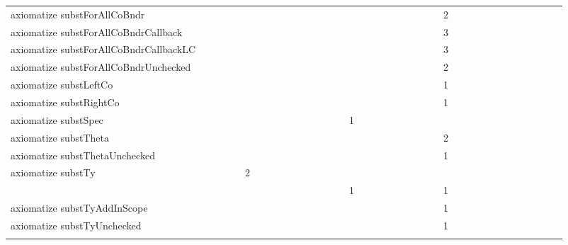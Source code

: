 {\begin{tabular}{l|rrr|rrr|rrr}
axiomatize substForAllCoBndr &  &  &  &  &  &  &  &  &  &  &  &  &  &  &  &  &  &  &  &  &  &  &  & 2 &  &  &  &  &  &  &  &  &  &  &  & \\
axiomatize substForAllCoBndrCallback &  &  &  &  &  &  &  &  &  &  &  &  &  &  &  &  &  &  &  &  &  &  &  & 3 &  &  &  &  &  &  &  &  &  &  &  & \\
axiomatize substForAllCoBndrCallbackLC &  &  &  &  &  &  &  &  &  &  &  &  &  &  &  &  &  &  &  &  &  &  &  & 3 &  &  &  &  &  &  &  &  &  &  &  & \\
axiomatize substForAllCoBndrUnchecked &  &  &  &  &  &  &  &  &  &  &  &  &  &  &  &  &  &  &  &  &  &  &  & 2 &  &  &  &  &  &  &  &  &  &  &  & \\
axiomatize substLeftCo &  &  &  &  &  &  &  &  &  &  &  &  &  &  &  &  &  &  &  &  &  &  &  & 1 &  &  &  &  &  &  &  &  &  &  &  & \\
axiomatize substRightCo &  &  &  &  &  &  &  &  &  &  &  &  &  &  &  &  &  &  &  &  &  &  &  & 1 &  &  &  &  &  &  &  &  &  &  &  & \\
axiomatize substSpec &  &  &  &  &  &  &  &  &  &  &  &  &  &  & 1 &  &  &  &  &  &  &  &  &  &  &  &  &  &  &  &  &  &  &  &  & \\
axiomatize substTheta &  &  &  &  &  &  &  &  &  &  &  &  &  &  &  &  &  &  &  &  &  &  &  & 2 &  &  &  &  &  &  &  &  &  &  &  & \\
axiomatize substThetaUnchecked &  &  &  &  &  &  &  &  &  &  &  &  &  &  &  &  &  &  &  &  &  &  &  & 1 &  &  &  &  &  &  &  &  &  &  &  & \\
axiomatize substTy &  &  &  &  & 2 &  &  &  & \\
\quad  &  &  &  &  &  &  &  &  &  &  &  &  &  &  & 1 &  &  &  &  &  &  &  &  & 1 &  &  &  &  &  &  &  &  &  &  &  & \\
axiomatize substTyAddInScope &  &  &  &  &  &  &  &  &  &  &  &  &  &  &  &  &  &  &  &  &  &  &  & 1 &  &  &  &  &  &  &  &  &  &  &  & \\
axiomatize substTyUnchecked &  &  &  &  &  &  &  &  &  &  &  &  &  &  &  &  &  &  &  &  &  &  &  & 1 &  &  &  &  &  &  &  &  &  &  &  & \\

\end{tabular}}
